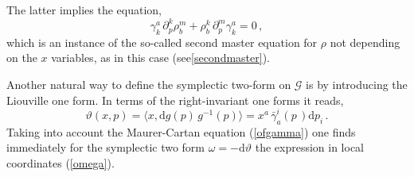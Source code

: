 \documentclass[12pt,a4paper]{article}
\numberwithin{equation}{section}
\theoremstyle{definition}
\newcommand{\dd}{\mathrm{d}}
\newcommand{\del}{\partial}
\newcommand{\eqn}{\eqref}
\begin{document}
The latter implies the equation,
\begin{equation}\label{eqrho}
 \gamma^a_k\,\partial^k_p\rho_b^m+\rho_b^k\,\partial^m_p \gamma^a_k=0\,,
\end{equation}
{
which is an instance of the so-called second master equation \cite{Kupriyanov:2022ohu} for $\rho$  not depending on the $x$ variables, as in this case (see\eqn{secondmaster}).}

Another natural way to define the symplectic two-form on $\mathcal{G}$ is by introducing the Liouville one form. %
In terms of the right-invariant one forms it reads,
\begin{equation}\label{LF}
    \vartheta(x,p)=\langle x, \dd g(p)\,g^{-1}(p)\rangle=x^a\, \bar\gamma_a^i(p\,)\dd p_i\,.
\end{equation} 
Taking into account the Maurer-Cartan equation (\ref{ofgamma}) one finds immediately for the symplectic two form $\omega= - \dd\vartheta$ the expression in local coordinates (\ref{omega}).
\end{document}
